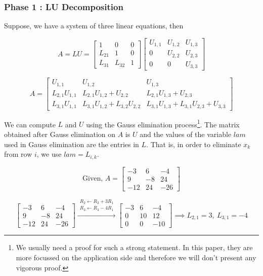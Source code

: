 \subsubsection{Phase 1 : LU Decomposition}
\begin{commentary}
	Suppose, we have a system of three linear equations, then

	\[ A = LU = \begin{bmatrix} 1 & 0 & 0 \\ L_{21} & 1 & 0 \\ L_{31} & L_{32} & 1 \end{bmatrix} \begin{bmatrix} U_{1,1} & U_{1,2} & U_{1,3} \\ 0 & U_{2,2} & U_{2,3} \\ 0 & 0 & U_{3,3} \end{bmatrix} \]

	\[ A= \begin{bmatrix} U_{1,1} & U_{1,2} & U_{1,3} \\ L_{2,1}U_{1,1} & L_{2,1}U_{1,2} + U_{2,2} & L_{2,1}U_{1,3} + U_{2,3} \\ L_{3,1}U_{1,1} & L_{3,1}U_{1,2} + L_{3,2}U_{2,2} & L_{3,1}U_{1,3} + L_{3,1}U_{2,3} + U_{3,3} \end{bmatrix} \]

	We can compute $L$ and $U$ using the Gauss elimination process\footnote{We usually need a proof for such a strong statement. In this paper, they are more focussed on the application side and therefore we will don't present any vigorous proof.}. The matrix obtained after Gauss elimination on $A$ is $U$ and the values of the variable $lam$ used in Gauss elimination are the entries in $L$. That is, in order to eliminate $x_k$ from row $i$, we use $lam = L_{i,k}$.
\end{commentary}

	\[ \text{Given, }A = \begin{bmatrix} -3 & 6 & -4 \\ 9 & -8 & 24 \\ -12 & 24 & -26 \end{bmatrix} \]

	\[ \begin{bmatrix} -3 & 6 & -4 \\ 9 & -8 & 24 \\ -12 & 24 & -26 \end{bmatrix} \xrightarrow{\substack{R_2 \leftarrow R_2 + 3R_1 \\ R_3 \leftarrow R_3 - 4R_1}} \begin{bmatrix} -3 & 6 & -4 \\ 0 & 10 & 12 \\ 0 & 0 & -10 \end{bmatrix} \implies L_{2,1} = 3,\ L_{3,1} = -4  \]

